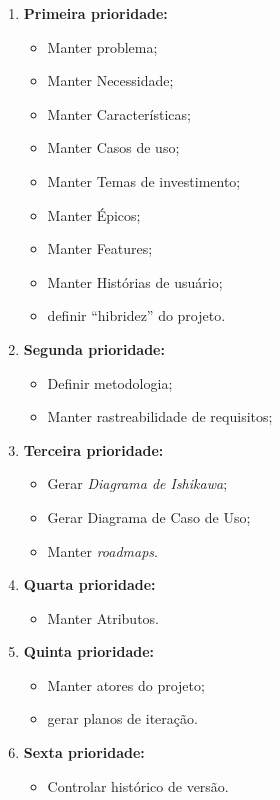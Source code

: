\begin{enumerate}
	\item \textbf{Primeira prioridade:}
		\begin{itemize}
			\item Manter problema;
			\item Manter Necessidade;
			\item Manter Características;
			\item Manter Casos de uso;
			\item Manter Temas de investimento;
			\item Manter Épicos;
			\item Manter Features;
			\item Manter Histórias de usuário;
			\item definir ``hibridez'' do projeto.
		\end{itemize}
	\item \textbf{Segunda prioridade:}
		\begin{itemize}
			\item Definir metodologia;
			\item Manter rastreabilidade de requisitos;
		\end{itemize}
	\item \textbf{Terceira prioridade:}
		\begin{itemize}
			\item Gerar \textit{Diagrama de Ishikawa};
			\item Gerar Diagrama de Caso de Uso;
			\item Manter \textit{roadmaps}.
		\end{itemize}
	\item \textbf{Quarta prioridade:}
		\begin{itemize}
			\item Manter Atributos.
		\end{itemize}
	\item \textbf{Quinta prioridade:}
		\begin{itemize}
			\item Manter atores do projeto;
			\item gerar planos de iteração.
		\end{itemize}
	\item \textbf{Sexta prioridade:}
		\begin{itemize}
			\item Controlar histórico de versão.
		\end{itemize}
\end{enumerate}

